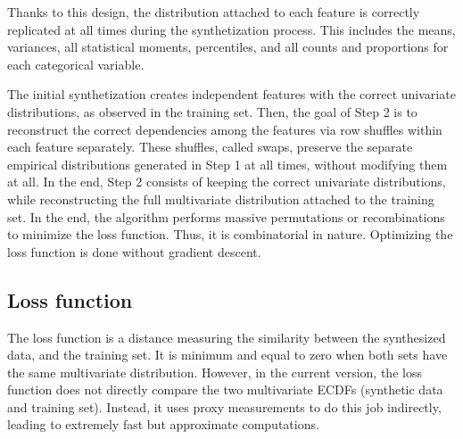 \documentclass[oneside,10pt]{book}
\begin{document}
\noindent Thanks to this design, the distribution attached to each feature is correctly replicated at all times during the synthetization process. This includes the means, variances, all statistical moments, percentiles, and all counts and proportions for each categorical variable.

The initial synthetization creates independent features with the correct univariate distributions, as observed in the training set. Then, the goal of Step 2 is to reconstruct
 the correct dependencies among the features via row shuffles within each feature separately. These shuffles, called \textcolor{index}{swaps}, preserve the separate empirical distributions generated in Step 1 at all times, without modifying them at all. In the end, Step 2 consists of keeping the correct univariate
 distributions, while reconstructing the full multivariate distribution attached to the training set. In the end, the algorithm performs massive permutations or recombinations to minimize the loss function. Thus, it is combinatorial in nature. Optimizing the loss function is done without \textcolor{index}{gradient descent}.

\subsection{Loss function}\label{ffgdfdsss}

The \textcolor{index}{loss function} is a distance measuring the similarity between the synthesized data, and the training set. It is minimum and equal to zero when both sets have the same multivariate distribution. However, in the current version, the loss function does not directly compare the two multivariate ECDFs (synthetic data and training set). Instead, it uses proxy measurements to do this job indirectly, leading to extremely fast but approximate computations.
\end{document}

